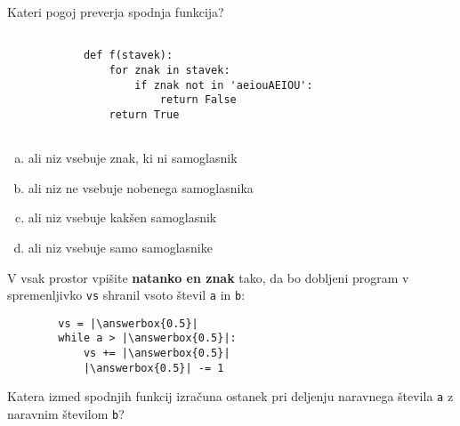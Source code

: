 \documentclass[arhiv, 10pt]{../izpit}
\newcommand{\inlinepy}[1]{\texttt{#1}}
\newcommand{\answerbox}[1]{\framebox{\vphantom{\large M}\hspace{#1cm}}}
\begin{document}
        \naloga*

        \begin{multicols}{2}
        \noindent
        Kateri pogoj preverja spodnja funkcija?
        \begin{verbatim}
        
            def f(stavek):
                for znak in stavek:
                    if znak not in 'aeiouAEIOU':
                        return False
                return True
            
        \end{verbatim}

        \begin{enumerate}[(a)]
\item ali niz vsebuje znak, ki ni samoglasnik
\item ali niz ne vsebuje nobenega samoglasnika
\item ali niz vsebuje kakšen samoglasnik
\item ali niz vsebuje samo samoglasnike
\end{enumerate}

        \end{multicols}
    
        \naloga*
        \begin{multicols}{2}
        \noindent
        V vsak prostor vpišite \textbf{natanko en znak} tako, da bo dobljeni program v spremenljivko \inlinepy{vs} shranil vsoto števil \inlinepy{a} in \inlinepy{b}:
        
        \columnbreak
        \begin{verbatim}
        vs = |\answerbox{0.5}|
        while a > |\answerbox{0.5}|:
            vs += |\answerbox{0.5}|
            |\answerbox{0.5}| -= 1
        \end{verbatim}
        \end{multicols}
    
        \clearpage
        \naloga
        
        Katera izmed spodnjih funkcij izračuna ostanek pri deljenju naravnega števila \inlinepy{a} z naravnim številom \inlinepy{b}?
    
\end{document}
